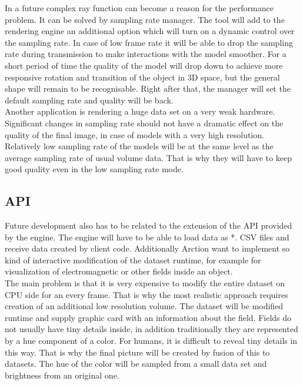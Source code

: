 \documentclass[twoside, english, 11pt]{report}
\begin{document}
In a future complex ray function can become a reason for the performance problem. It can be solved by sampling rate manager. The tool will add to the rendering engine an additional option which will turn on a dynamic control over the sampling rate. In case of low frame rate it will be able to drop the sampling rate during transmission to make interactions with the model smoother. For a short period of time the quality of the model will drop down to achieve more responsive rotation and transition of the object in 3D space, but the general shape will remain to be recognisable. Right after that, the manager will set the default sampling rate and quality will be back.\\

Another application is rendering a huge data set on a very weak hardware. Significant changes in sampling rate should not have a dramatic effect on the quality of the final image, in case of models with a very high resolution. Relatively low sampling rate of the models will be at the same level as the average sampling rate of usual volume data. That is why they will have to keep good quality even in the low sampling rate mode.


\subsection{API}

Future development also has to be related to the extension of the API provided by the engine. The engine will have to be able to load data as *. CSV files and receive data created by client code. Additionally Arction want to implement so kind of interactive modification of the dataset runtime, for example for visualization of electromagnetic or other fields inside an object. \\

The main problem is that it is very expensive to modify the entire dataset on CPU side for an every frame. That is why the most realistic approach requires creation of an additional low resolution volume. The dataset will be modified runtime and supply graphic card with an information about the field. Fields do not usually have tiny details inside, in addition traditionally they are represented by a hue component of a color. For humans, it is difficult to reveal tiny details in this way. That is why the final picture will be created by fusion of this to datasets. The hue of the color will be sampled from a small data set and brightness from an original one.




\newpage





\end{document}

